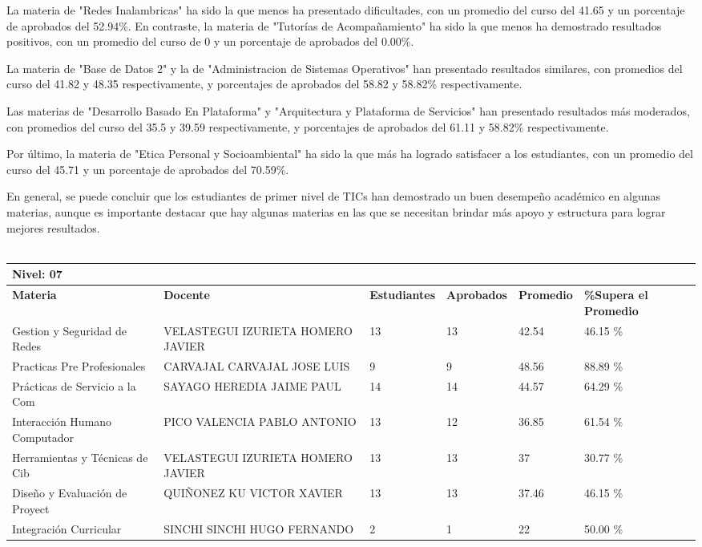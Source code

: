 La materia de "Redes Inalambricas" ha sido la que menos ha presentado dificultades, con un promedio del curso del 41.65 y un porcentaje de aprobados del 52.94\%. En contraste, la materia de "Tutorías de Acompañamiento" ha sido la que menos ha demostrado resultados positivos, con un promedio del curso de 0 y un porcentaje de aprobados del 0.00\%.

La materia de "Base de Datos 2" y la de "Administracion de Sistemas Operativos" han presentado resultados similares, con promedios del curso del 41.82 y 48.35 respectivamente, y porcentajes de aprobados del 58.82 y 58.82\% respectivamente.

Las materias de "Desarrollo Basado En Plataforma" y "Arquitectura y Plataforma de Servicios" han presentado resultados más moderados, con promedios del curso del 35.5 y 39.59 respectivamente, y porcentajes de aprobados del 61.11 y 58.82\% respectivamente.

Por último, la materia de "Etica Personal y Socioambiental" ha sido la que más ha logrado satisfacer a los estudiantes, con un promedio del curso del 45.71 y un porcentaje de aprobados del 70.59\%.

En general, se puede concluir que los estudiantes de primer nivel de TICs han demostrado un buen desempeño académico en algunas materias, aunque es importante destacar que hay algunas materias en las que se necesitan brindar más apoyo y estructura para lograr mejores resultados.\\
\vspace{1cm}\\\small
\begin{tabularx}{\textwidth}{|p{2.5cm}|p{2.5cm}|X|X|X|X|}
\hline
\multicolumn{6}{|X|}{\textbf{Nivel: 07 }}\\\hline\textbf{Materia} & \textbf{Docente} & \textbf{Estudiantes} & \textbf{Aprobados} & \textbf{Promedio} & \textbf{\%Supera el Promedio} \\ \hline
Gestion y Seguridad de Redes & VELASTEGUI IZURIETA HOMERO JAVIER & 13 & 13 & 42.54 & 46.15 \%\\ \hline
Practicas Pre Profesionales & CARVAJAL CARVAJAL JOSE LUIS & 9 & 9 & 48.56 & 88.89 \%\\ \hline
Prácticas de Servicio a la Com & SAYAGO HEREDIA JAIME PAUL & 14 & 14 & 44.57 & 64.29 \%\\ \hline
Interacción Humano Computador & PICO VALENCIA PABLO ANTONIO & 13 & 12 & 36.85 & 61.54 \%\\ \hline
Herramientas y Técnicas de Cib & VELASTEGUI IZURIETA HOMERO JAVIER & 13 & 13 & 37 & 30.77 \%\\ \hline
Diseño y Evaluación de Proyect & QUIÑONEZ KU VICTOR XAVIER & 13 & 13 & 37.46 & 46.15 \%\\ \hline
Integración Curricular & SINCHI SINCHI HUGO FERNANDO & 2 & 1 & 22 & 50.00 \%\\ \hline
\end{tabularx}

